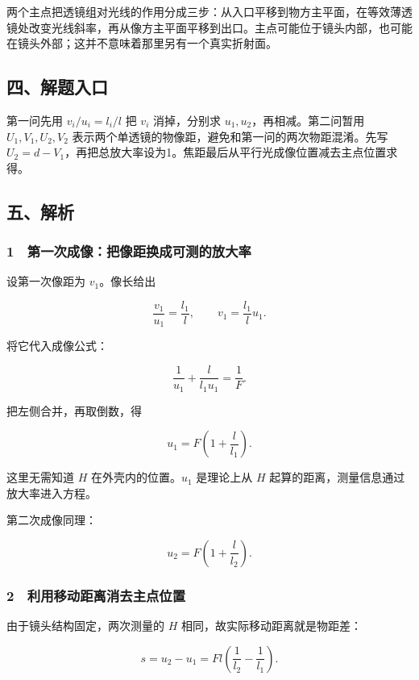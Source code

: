 \documentclass[12pt,a4paper,fontset=fandol]{ctexart}
\begin{document}
两个主点把透镜组对光线的作用分成三步：从入口平移到物方主平面，在等效薄透镜处改变光线斜率，再从像方主平面平移到出口。主点可能位于镜头内部，也可能在镜头外部；这并不意味着那里另有一个真实折射面。

\subsection{四、解题入口}\label{ux56dbux89e3ux9898ux5165ux53e3}

第一问先用 \(v_i/u_i=l_i/l\) 把 \(v_i\) 消掉，分别求
\(u_1,u_2\)，再相减。第二问暂用 \(U_1,V_1,U_2,V_2\)
表示两个单透镜的物像距，避免和第一问的两次物距混淆。先写
\(U_2=d-V_1\)，再把总放大率设为1。焦距最后从平行光成像位置减去主点位置求得。

\subsection{五、解析}\label{ux4e94ux89e3ux6790}

\subsubsection{1　第一次成像：把像距换成可测的放大率}\label{ux7b2cux4e00ux6b21ux6210ux50cfux628aux50cfux8dddux6362ux6210ux53efux6d4bux7684ux653eux5927ux7387}

设第一次像距为 \(v_1\)。像长给出

\[\frac{v_1}{u_1}=\frac{l_1}{l},\qquad v_1=\frac{l_1}{l}u_1.\]

将它代入成像公式：

\[\frac1{u_1}+\frac{l}{l_1u_1}=\frac1F.\]

把左侧合并，再取倒数，得

\[\boxed{u_1=F\left(1+\frac l{l_1}\right).}\]

这里无需知道 \(H\) 在外壳内的位置。\(u_1\) 是理论上从 \(H\)
起算的距离，测量信息通过放大率进入方程。

第二次成像同理：

\[u_2=F\left(1+\frac l{l_2}\right).\]

\subsubsection{2　利用移动距离消去主点位置}\label{ux5229ux7528ux79fbux52a8ux8dddux79bbux6d88ux53bbux4e3bux70b9ux4f4dux7f6e}

由于镜头结构固定，两次测量的 \(H\) 相同，故实际移动距离就是物距差：

\[s=u_2-u_1=Fl\left(\frac1{l_2}-\frac1{l_1}\right).\]
\end{document}
